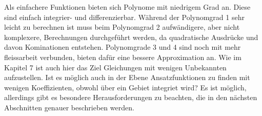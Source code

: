 Als einfachere Funktionen bieten sich Polynome mit niedrigem Grad an. Diese sind einfach integrier- und differenzierbar. Während der Polynomgrad 1 sehr leicht zu berechnen ist muss beim Polynomgrad 2 aufwändigere, aber nicht komplexere, Berechnungen durchgeführt werden, da quadratische Ausdrücke und davon Kominationen entstehen. Polynomgrade 3 und 4 sind noch mit mehr fleissarbeit verbunden, bieten dafür eine bessere Approximation an. Wie im Kapitel 7 ist auch hier das Ziel Gleichungen mit wenigen Unbekannten aufzustellen. Ist es möglich auch in der Ebene Ansatzfunktionen zu finden mit wenigen Koeffizienten, obwohl über ein Gebiet integriet wird? Es ist möglich, allerdings gibt es besondere Herausforderungen zu beachten, die in den nächsten Abschnitten genauer beschrieben werden.


